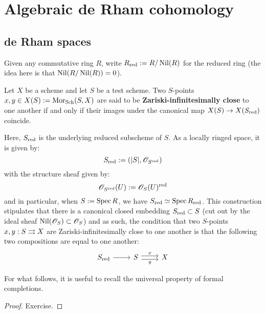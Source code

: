 \section{Algebraic de Rham cohomology}
    \subsection{de Rham spaces}
        \begin{convention}
            Given any commutative ring $R$, write $R_{\mathrm{red}} := R/\operatorname{Nil}(R)$ for the  reduced ring (the idea here is that $\operatorname{Nil}(R/\operatorname{Nil}(R)) = 0$).
        \end{convention}
    
        \begin{definition} \label{def: zariski_infinitesimally_close_points}
            Let $X$ be a scheme and let $S$ be a test scheme. Two $S$-points $x, y \in X(S) := \mathrm{Mor}_{\mathrm{Sch}}(S, X)$ are said to be \textbf{Zariski-infinitesimally close} to one another if and only if their images under the canonical map $X(S) \to X(S_{\mathrm{red}})$ coincide.
        \end{definition}
        Here, $S_{\mathrm{red}}$ is the underlying reduced subscheme of $S$. As a locally ringed space, it is given by:
            $$S_{\mathrm{red}} := (|S|, \mathscr{O}_{S^{\mathrm{red}}})$$
        with the structure sheaf given by:
            $$\mathscr{O}_{S^{\mathrm{red}}}(U) := \mathscr{O}_S(U)^{\mathrm{red}}$$
        and in particular, when $S := \operatorname{Spec} R$, we have $S_{\mathrm{red}} \simeq \operatorname{Spec} R_{\mathrm{red}}$. This construction stipulates that there is a canonical closed embedding $S_{\mathrm{red}} \subset S$ (cut out by the ideal sheaf $\operatorname{Nil}(\mathscr{O}_S) \subset \mathscr{O}_S$) and as such, the condition that two $S$-points $x, y: S \rightrightarrows X$ are Zariski-infinitesimally close to one another is that the following two compositions are equal to one another:
            $$
                \begin{tikzcd}
                {S_{\red}} & S & X
                \arrow[from=1-1, to=1-2]
                \arrow["y"', shift right, from=1-2, to=1-3]
                \arrow["x", shift left, from=1-2, to=1-3]
                \end{tikzcd}
            $$

        For what follows, it is useful to recall the universal property of formal completions. 
        \begin{lemma} \label{lemma: universal_property_of_formal_completion}
            
        \end{lemma}
            \begin{proof}
                Exercise.
            \end{proof}

